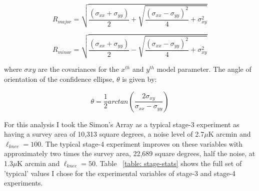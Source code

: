 \begin{equation}
R_{major} = \sqrt{\frac{(\sigma_{xx} + \sigma_{yy})}{2} + \sqrt{\frac{(\sigma_{xx} - \sigma_{yy})^2}{4} + \sigma_{xy}^2}}
\end{equation}

\begin{equation}
R_{minor} = \sqrt{\frac{(\sigma_{xx} + \sigma_{yy})}{2} - \sqrt{\frac{(\sigma_{xx} - \sigma_{yy})^2}{4} + \sigma_{xy}^2}}
\end{equation}

where $\sigma{xy}$ are the covariances for the $x^{th}$ and $y^{th}$ model parameter. The angle of orientation of the confidence ellipse, $\theta$ is given by:

\begin{equation}
\theta = \frac{1}{2}arctan(\frac{2\sigma_{xy}}{\sigma_{xx}-\sigma_{yy}})
\end{equation}

For this analysis I took the Simon's Array as a typical stage-3 experiment as having a survey area of 10,313 square degrees, a noise level of 2.7$\mu$K arcmin and $\ell_{knee} = 100$. The typical stage-4 experiment improves on these variables with approximately two times the survey area, 22,689 square degrees, half the noise, at 1.3$\mu$K arcmin and $\ell_{knee} = 50$. Table ~\ref{table: stage-stats} shows the full set of 'typical' values I chose for the experimental variables of stage-3 and stage-4 experiments.


